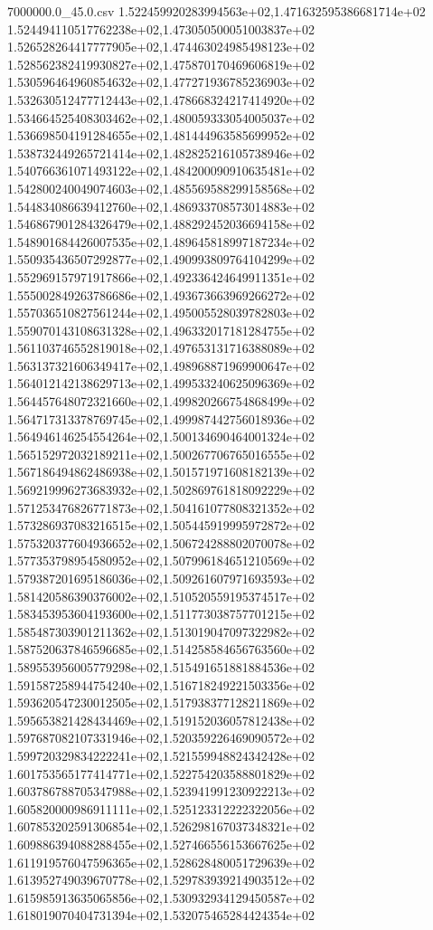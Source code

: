 \begin{filecontents*}{7000000.0_45.0.csv}
1.522459920283994563e+02,1.471632595386681714e+02
1.524494110517762238e+02,1.473050500051003837e+02
1.526528264417777905e+02,1.474463024985498123e+02
1.528562382419930827e+02,1.475870170469606819e+02
1.530596464960854632e+02,1.477271936785236903e+02
1.532630512477712443e+02,1.478668324217414920e+02
1.534664525408303462e+02,1.480059333054005037e+02
1.536698504191284655e+02,1.481444963585699952e+02
1.538732449265721414e+02,1.482825216105738946e+02
1.540766361071493122e+02,1.484200090910635481e+02
1.542800240049074603e+02,1.485569588299158568e+02
1.544834086639412760e+02,1.486933708573014883e+02
1.546867901284326479e+02,1.488292452036694158e+02
1.548901684426007535e+02,1.489645818997187234e+02
1.550935436507292877e+02,1.490993809764104299e+02
1.552969157971917866e+02,1.492336424649911351e+02
1.555002849263786686e+02,1.493673663969266272e+02
1.557036510827561244e+02,1.495005528039782803e+02
1.559070143108631328e+02,1.496332017181284755e+02
1.561103746552819018e+02,1.497653131716388089e+02
1.563137321606349417e+02,1.498968871969900647e+02
1.564012142138629713e+02,1.499533240625096369e+02
1.564457648072321660e+02,1.499820266754868499e+02
1.564717313378769745e+02,1.499987442756018936e+02
1.564946146254554264e+02,1.500134690464001324e+02
1.565152972032189211e+02,1.500267706765016555e+02
1.567186494862486938e+02,1.501571971608182139e+02
1.569219996273683932e+02,1.502869761818092229e+02
1.571253476826771873e+02,1.504161077808321352e+02
1.573286937083216515e+02,1.505445919995972872e+02
1.575320377604936652e+02,1.506724288802070078e+02
1.577353798954580952e+02,1.507996184651210569e+02
1.579387201695186036e+02,1.509261607971693593e+02
1.581420586390376002e+02,1.510520559195374517e+02
1.583453953604193600e+02,1.511773038757701215e+02
1.585487303901211362e+02,1.513019047097322982e+02
1.587520637846596685e+02,1.514258584656763560e+02
1.589553956005779298e+02,1.515491651881884536e+02
1.591587258944754240e+02,1.516718249221503356e+02
1.593620547230012505e+02,1.517938377128211869e+02
1.595653821428434469e+02,1.519152036057812438e+02
1.597687082107331946e+02,1.520359226469090572e+02
1.599720329834222241e+02,1.521559948824342428e+02
1.601753565177414771e+02,1.522754203588801829e+02
1.603786788705347988e+02,1.523941991230922213e+02
1.605820000986911111e+02,1.525123312222322056e+02
1.607853202591306854e+02,1.526298167037348321e+02
1.609886394088288455e+02,1.527466556153667625e+02
1.611919576047596365e+02,1.528628480051729639e+02
1.613952749039670778e+02,1.529783939214903512e+02
1.615985913635065856e+02,1.530932934129450587e+02
1.618019070404731394e+02,1.532075465284424354e+02

\end{filecontents*}
